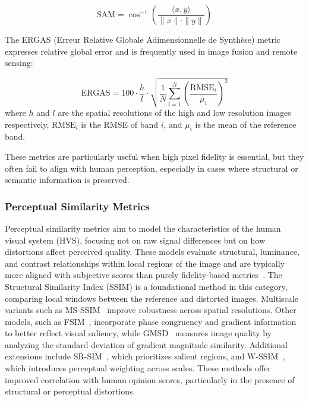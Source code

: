 \begin{equation}
\text{SAM} = \cos^{-1} \left( \frac{\langle x, y \rangle}{\|x\| \cdot \|y\|} \right)
\end{equation}

The ERGAS (Erreur Relative Globale Adimensionnelle de Synthèse) metric expresses relative global error and is frequently used in image fusion and remote sensing:

\begin{equation}
\text{ERGAS} = 100 \cdot \frac{h}{l} \cdot \sqrt{ \frac{1}{N} \sum_{i=1}^{N} {\left( \frac{\text{RMSE}_i}{\mu_i} \right)}^2 }
\end{equation}
where $h$ and $l$ are the spatial resolutions of the high and low resolution images respectively, $\text{RMSE}_i$ is the RMSE of band $i$, and $\mu_i$ is the mean of the reference band.

These metrics are particularly useful when high pixel fidelity is essential, but they often fail to align with human perception, especially in cases where structural or semantic information is preserved.


\subsubsection{Perceptual Similarity Metrics}\label{sec:perceptual_metrics}

Perceptual similarity metrics aim to model the characteristics of the human visual system (HVS), focusing not on raw signal differences but on how distortions affect perceived quality. These models evaluate structural, luminance, and contrast relationships within local regions of the image and are typically more aligned with subjective scores than purely fidelity-based metrics~\cite{wang2004image,chandler2007vsnr}. The Structural Similarity Index (SSIM) is a foundational method in this category, comparing local windows between the reference and distorted images. Multiscale variants such as MS-SSIM~\cite{Wang2003MSSSIM} improve robustness across spatial resolutions. Other models, such as FSIM~\cite{Zhang2011FSIM}, incorporate phase congruency and gradient information to better reflect visual saliency, while GMSD~\cite{Xue2014GMSD} measures image quality by analyzing the standard deviation of gradient magnitude similarity. Additional extensions include SR-SIM~\cite{Zhang2012SRSIM}, which prioritizes salient regions, and W-SSIM~\cite{Engelke2011WSSIM}, which introduces perceptual weighting across scales. These methods offer improved correlation with human opinion scores, particularly in the presence of structural or perceptual distortions.

